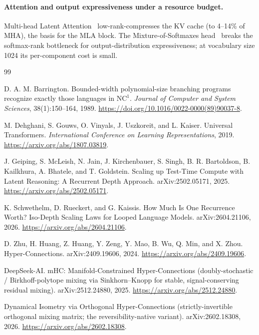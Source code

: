 \documentclass[11pt]{article}
\begin{document}
\paragraph{Attention and output expressiveness under a resource budget.}
Multi-head Latent Attention~\cite{deepseekv2} low-rank-compresses the KV cache (to 4--14\% of
MHA), the basis for the MLA block. The Mixture-of-Softmaxes head~\cite{mos} breaks the
softmax-rank bottleneck for output-distribution expressiveness; at vocabulary size 1024 its
per-component cost is small.

\begin{thebibliography}{99}

D. A. M. Barrington.
\newblock Bounded-width polynomial-size branching programs recognize exactly those languages in
\(\mathrm{NC}^{1}\).
\newblock \emph{Journal of Computer and System Sciences}, 38(1):150--164, 1989.
\newblock \url{https://doi.org/10.1016/0022-0000(89)90037-8}.

M. Dehghani, S. Gouws, O. Vinyals, J. Uszkoreit, and L. Kaiser.
\newblock Universal Transformers.
\newblock \emph{International Conference on Learning Representations}, 2019.
\newblock \url{https://arxiv.org/abs/1807.03819}.

J. Geiping, S. McLeish, N. Jain, J. Kirchenbauer, S. Singh, B. R. Bartoldson,
B. Kailkhura, A. Bhatele, and T. Goldstein.
\newblock Scaling up Test-Time Compute with Latent Reasoning: A Recurrent Depth Approach.
\newblock arXiv:2502.05171, 2025.
\newblock \url{https://arxiv.org/abs/2502.05171}.

K. Schwethelm, D. Rueckert, and G. Kaissis.
\newblock How Much Is One Recurrence Worth? Iso-Depth Scaling Laws for Looped Language Models.
\newblock arXiv:2604.21106, 2026.
\newblock \url{https://arxiv.org/abs/2604.21106}.

D. Zhu, H. Huang, Z. Huang, Y. Zeng, Y. Mao, B. Wu, Q. Min, and X. Zhou.
\newblock Hyper-Connections.
\newblock arXiv:2409.19606, 2024.
\newblock \url{https://arxiv.org/abs/2409.19606}.

DeepSeek-AI.
\newblock mHC: Manifold-Constrained Hyper-Connections (doubly-stochastic / Birkhoff-polytope mixing
via Sinkhorn--Knopp for stable, signal-conserving residual mixing).
\newblock arXiv:2512.24880, 2025.
\newblock \url{https://arxiv.org/abs/2512.24880}.

\newblock Dynamical Isometry via Orthogonal Hyper-Connections (strictly-invertible orthogonal mixing
matrix; the reversibility-native variant).
\newblock arXiv:2602.18308, 2026.
\newblock \url{https://arxiv.org/abs/2602.18308}.


\end{thebibliography}
\end{document}

